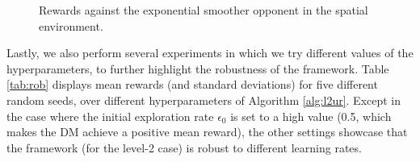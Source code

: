 \begin{figure}[h]
\centering
{}%
  \caption{Rewards against the exponential smoother opponent in the spatial environment. }
\end{figure}


Lastly, we also perform several experiments in which we try different values of the hyperparameters,  to further highlight the robustness of the framework. Table \ref{tab:rob} displays mean rewards (and standard deviations) for five different random seeds, over different hyperparameters of Algorithm \ref{alg:l2ur}. Except in the case where the initial exploration rate $\epsilon_0$ is set to a high value (0.5, which makes the DM achieve a positive mean reward), the other settings showcase that the framework (for the level-2 case) is robust to different learning rates.

